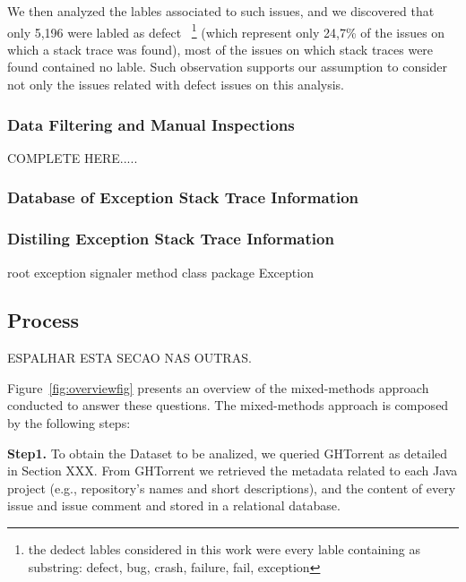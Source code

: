 \documentclass[conference]{IEEEtran}
\begin{document}
We then analyzed the lables associated to such issues, and we discovered that only 5,196 were labled as defect ~\footnote{the dedect lables considered in this work were every lable containing as substring: defect, bug, crash, failure, fail, exception} (which represent only 24,7\% of the issues on which a stack trace was found), most of the issues on which stack traces were found contained no lable. Such observation supports our assumption to consider not only the issues related with defect issues on this analysis.


\subsubsection{Data Filtering and Manual Inspections}

COMPLETE HERE.....

\subsubsection{Database of Exception Stack Trace Information}
\subsubsection{Distiling Exception Stack Trace Information}

\- root exception
\- signaler
\- method
\- class
\- package
\- Exception

\subsection{Process}

ESPALHAR ESTA SECAO NAS OUTRAS.

Figure~\ref{fig:overviewfig} presents an overview of the mixed-methods approach
conducted to answer these questions. The mixed-methods approach is composed by the following steps:



\textbf{Step1.} To obtain the Dataset to be analized, we queried GHTorrent as detailed in Section XXX. From GHTorrent we retrieved the metadata related to each Java project (e.g., 
repository's names and short descriptions), and the content of every issue and issue comment 
and stored in a relational database.
\end{document}
